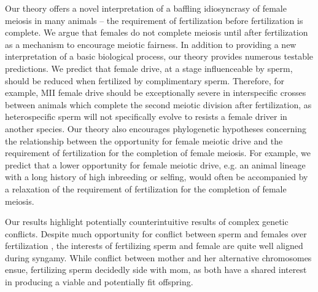 \documentclass{pnastwo}
\begin{document}
\begin{article}
Our theory offers a novel interpretation of a baffling idiosyncrasy of female meiosis in many animals -- the requirement of fertilization before fertilization is complete. 
We argue that females do not complete meiosis until after fertilization as a mechanism to encourage meiotic fairness. 
In addition to providing a new interpretation of a basic biological process, our theory provides numerous testable predictions. 
We predict that female drive, at a stage influenceable by sperm,  
	should be reduced when fertilized by
	complimentary sperm. 
Therefore, for example, MII female drive should be exceptionally severe in
	interspecific crosses between animals which complete the second meiotic division after fertilization,  
	as heterospecific sperm will not specifically evolve to resists a female driver in another species. 
Our theory also encourages phylogenetic hypotheses concerning the relationship between the opportunity 
	for female meiotic drive and the requirement of fertilization for the completion of female meiosis. 
For example, we predict that a lower opportunity for female meiotic drive,
        e.g. an animal lineage with a long history of high inbreeding
        or selfing, 
        would often be accompanied by a relaxation of the requirement of fertilization for the
        completion of female meiosis.


Our results highlight potentially counterintuitive results of complex genetic conflicts. 
Despite much opportunity for conflict between sperm and females over fertilization \cite{Partridge1998},
	the interests of fertilizing sperm and female are quite well aligned during syngamy.
While conflict between mother and her alternative chromosomes ensue, 
	fertilizing sperm decidedly side with mom, as both have a shared interest in producing a viable and potentially fit offspring. 



\end{article}
\end{document}
